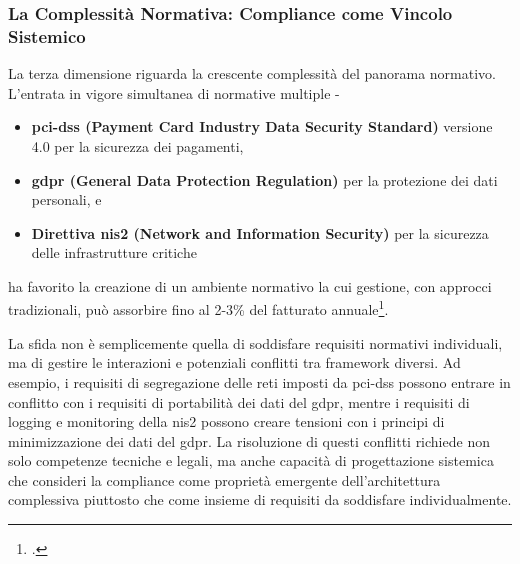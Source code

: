 
\subsubsection{La Complessità Normativa: Compliance come Vincolo Sistemico}

La terza dimensione riguarda la crescente complessità del panorama normativo. L'entrata in vigore simultanea di normative multiple - 
\begin{itemize}
    \item \textbf{\gls{pci-dss} (Payment Card Industry Data Security Standard)} versione 4.0 per la sicurezza dei pagamenti,
    \item \textbf{\gls{gdpr} (General Data Protection Regulation)} per la protezione dei dati personali, e
    \item \textbf{Direttiva \gls{nis2} (Network and Information Security) }per la sicurezza delle infrastrutture critiche 
\end{itemize}
ha favorito la creazione di  un ambiente normativo la cui gestione, con approcci tradizionali, può assorbire fino al 2-3\% del fatturato annuale\footcite{ponemon2024compliance}.

La sfida non è semplicemente quella di soddisfare requisiti normativi individuali, ma di gestire le interazioni e potenziali conflitti tra framework diversi. 
Ad esempio, i requisiti di segregazione delle reti imposti da \gls{pci-dss} possono entrare in conflitto con i requisiti di portabilità dei dati del \gls{gdpr}, mentre i requisiti di logging e monitoring della \gls{nis2} possono creare tensioni con i principi di minimizzazione dei dati del \gls{gdpr}. 
La risoluzione di questi conflitti richiede non solo competenze tecniche e legali, ma anche capacità di progettazione sistemica che consideri la compliance come proprietà emergente dell'architettura complessiva piuttosto che come insieme di requisiti da soddisfare individualmente.

